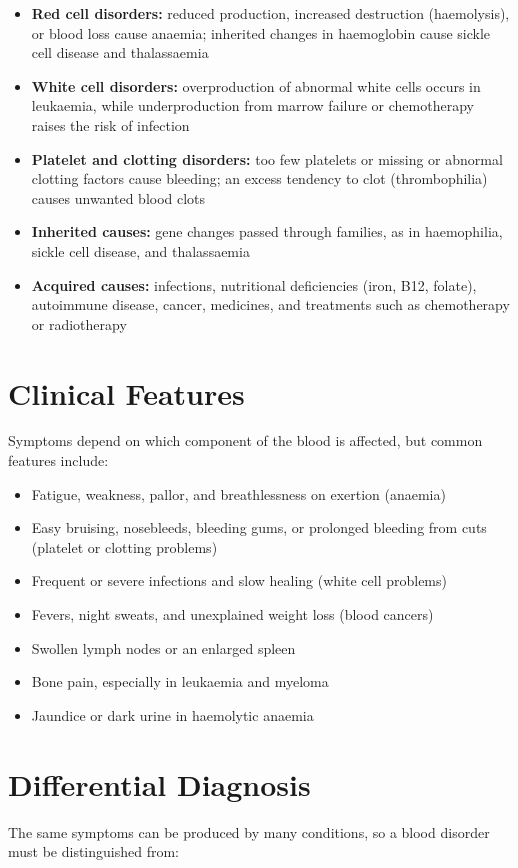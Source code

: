 \begin{itemize}
    \item \textbf{Red cell disorders:} reduced production, increased destruction (haemolysis), or blood loss cause anaemia; inherited changes in haemoglobin cause sickle cell disease and thalassaemia
    \item \textbf{White cell disorders:} overproduction of abnormal white cells occurs in leukaemia, while underproduction from marrow failure or chemotherapy raises the risk of infection
    \item \textbf{Platelet and clotting disorders:} too few platelets or missing or abnormal clotting factors cause bleeding; an excess tendency to clot (thrombophilia) causes unwanted blood clots
    \item \textbf{Inherited causes:} gene changes passed through families, as in haemophilia, sickle cell disease, and thalassaemia
    \item \textbf{Acquired causes:} infections, nutritional deficiencies (iron, B12, folate), autoimmune disease, cancer, medicines, and treatments such as chemotherapy or radiotherapy
\end{itemize}

\section*{Clinical Features}
Symptoms depend on which component of the blood is affected, but common features include:

\begin{itemize}
    \item Fatigue, weakness, pallor, and breathlessness on exertion (anaemia)
    \item Easy bruising, nosebleeds, bleeding gums, or prolonged bleeding from cuts (platelet or clotting problems)
    \item Frequent or severe infections and slow healing (white cell problems)
    \item Fevers, night sweats, and unexplained weight loss (blood cancers)
    \item Swollen lymph nodes or an enlarged spleen
    \item Bone pain, especially in leukaemia and myeloma
    \item Jaundice or dark urine in haemolytic anaemia
\end{itemize}

\section*{Differential Diagnosis}
The same symptoms can be produced by many conditions, so a blood disorder must be distinguished from:

